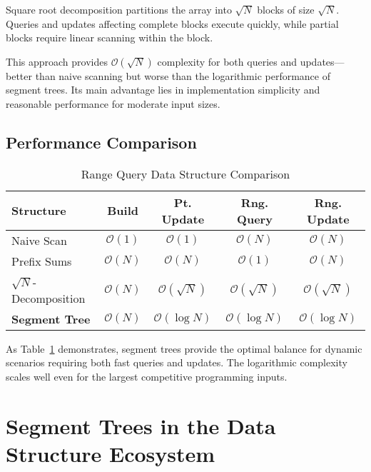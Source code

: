 
Square root decomposition partitions the array into $\sqrt{N}$ blocks of size $\sqrt{N}$. Queries and updates affecting complete blocks execute quickly, while partial blocks require linear scanning within the block.

This approach provides $\mathcal{O}(\sqrt{N})$ complexity for both queries and updates—better than naive scanning but worse than the logarithmic performance of segment trees. Its main advantage lies in implementation simplicity and reasonable performance for moderate input sizes.

\subsection{Performance Comparison}

\begin{table}[h!]
\centering
\caption{Range Query Data Structure Comparison}
\label{tab:ds_comparison}
\begin{tabular}{@{}lcccc@{}}
\toprule
\textbf{Structure} & \textbf{Build} & \textbf{Pt. Update} & \textbf{Rng. Query} & \textbf{Rng. Update} \\
\midrule
Naive Scan & $\mathcal{O}(1)$ & $\mathcal{O}(1)$ & $\mathcal{O}(N)$ & $\mathcal{O}(N)$ \\
Prefix Sums & $\mathcal{O}(N)$ & $\mathcal{O}(N)$ & $\mathcal{O}(1)$ & $\mathcal{O}(N)$ \\
$\sqrt{N}$-Decomposition & $\mathcal{O}(N)$ & $\mathcal{O}(\sqrt{N})$ & $\mathcal{O}(\sqrt{N})$ & $\mathcal{O}(\sqrt{N})$ \\
\textbf{Segment Tree} & $\mathcal{O}(N)$ & $\mathcal{O}(\log N)$ & $\mathcal{O}(\log N)$ & $\mathcal{O}(\log N)$ \\
\bottomrule
\end{tabular}
\end{table}

As Table~\ref{tab:ds_comparison} demonstrates, segment trees provide the optimal balance for dynamic scenarios requiring both fast queries and updates. The logarithmic complexity scales well even for the largest competitive programming inputs.

\section{Segment Trees in the Data Structure Ecosystem}
\label{sec:ecosystem_comparison}

